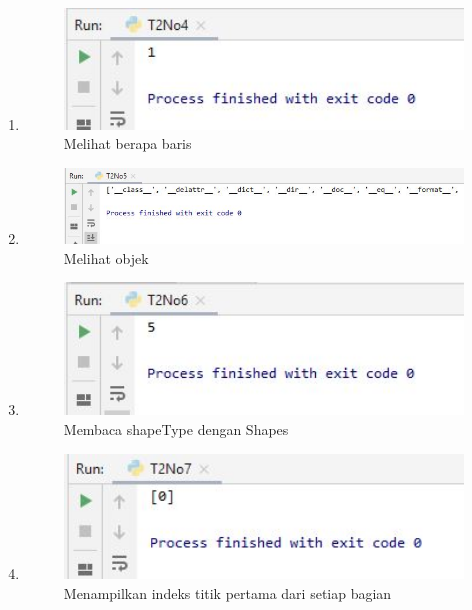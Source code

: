 \begin{enumerate}
	\item 
	
	\begin{figure}[H]
		\includegraphics[width=12cm]{figures/1174042/T2No4.JPG}
		\centering
		\caption{Melihat berapa baris}
	\end{figure}
	
	\item 
	
	\begin{figure}[H]
		\includegraphics[width=12cm]{figures/1174042/T2No5.JPG}
		\centering
		\caption{Melihat objek}
	\end{figure}
	
	\item 
	
	\begin{figure}[H]
		\includegraphics[width=12cm]{figures/1174042/T2No6.JPG}
		\centering
		\caption{Membaca shapeType dengan Shapes}
	\end{figure}
	
	\item 
	
	\begin{figure}[H]
		\includegraphics[width=12cm]{figures/1174042/T2No7.JPG}
		\centering
		\caption{Menampilkan indeks titik pertama dari setiap bagian}
	\end{figure}
	

\end{enumerate}
